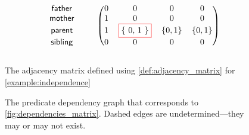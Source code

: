\documentclass[runningheads]{llncs}
\renewcommand\fbox{\fcolorbox{red}{white}}
\begin{document}
\begin{figure}[t]
  \centering
  \begin{minipage}{.49\textwidth}
    \centering
    \[
      \begin{blockarray}{ccccccc}
        \begin{block}{ccc(cccc)}
          \mathsf{father} & & & 0 & 0 & 0 & 0 \\
          \mathsf{mother} & & & 1 & 0 & 0 & 0 \\
          \mathsf{parent} & & & 1 & \fbox{\{ 0, 1 \}} & \{ 0, 1 \} & \{ 0, 1 \} \\
          \mathsf{sibling} & & & 0 & 0 & 0 & 0 \\
        \end{block}
      \end{blockarray}
    \]
    \caption{The adjacency matrix defined using \cref{def:adjacency_matrix} for
      \cref{example:independence}}
    \label{fig:dependencies_matrix}
  \end{minipage}
  \begin{minipage}{.5\textwidth}
    \centering
    \caption{The predicate dependency graph that corresponds to
      \cref{fig:dependencies_matrix}. Dashed edges are undetermined---they may
      or may not exist.}
    \label{fig:dependencies2}
  \end{minipage}
\end{figure}
\end{document}
